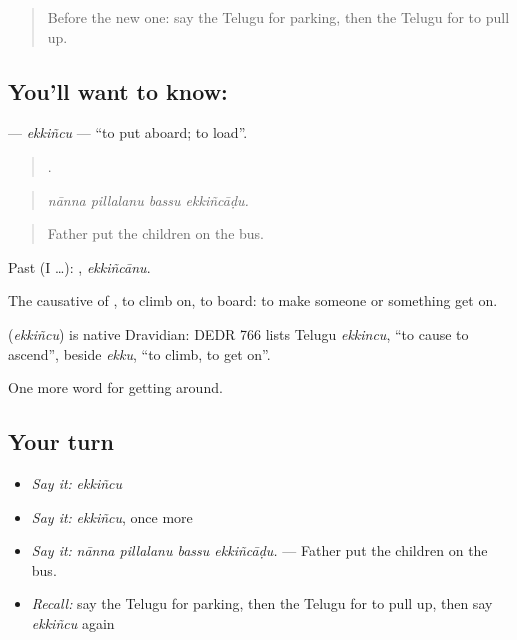 \label{lesson:TE-C450-ekkincu}



\begin{quote}
Before the new one: say the Telugu for parking, then the Telugu for to pull up.
\end{quote}

\subsection*{You'll want to know: }
\textbf{} — \emph{ekkiñcu} — \textquotedblleft{}to put aboard; to load\textquotedblright{}.

\begin{quote}
   .
\end{quote}

\begin{quote}
\emph{nānna pillalanu bassu ekkiñcāḍu.}
\end{quote}

\begin{quote}
Father put the children on the bus.
\end{quote}

Past (I …): , \emph{ekkiñcānu}.

The causative of , to climb on, to board: to make someone or something get on.

\begin{cousinweb}
\textbf{} (\emph{ekkiñcu}) is native Dravidian: DEDR 766 lists Telugu \emph{ekkincu}, \textquotedblleft{}to cause to ascend\textquotedblright{}, beside \emph{ekku}, \textquotedblleft{}to climb, to get on\textquotedblright{}.
\end{cousinweb}

\begin{grammarlens}[title={What you've built}]
One more word for getting around.
\end{grammarlens}

\subsection*{Your turn}
\begin{itemize}
\raggedright
  \item \emph{Say it:} \emph{ekkiñcu}
  \item \emph{Say it:} \emph{ekkiñcu}, once more
  \item \emph{Say it:} \emph{nānna pillalanu bassu ekkiñcāḍu.} — Father put the children on the bus.
  \item \emph{Recall:} say the Telugu for parking, then the Telugu for to pull up, then say \emph{ekkiñcu} again
\end{itemize}

